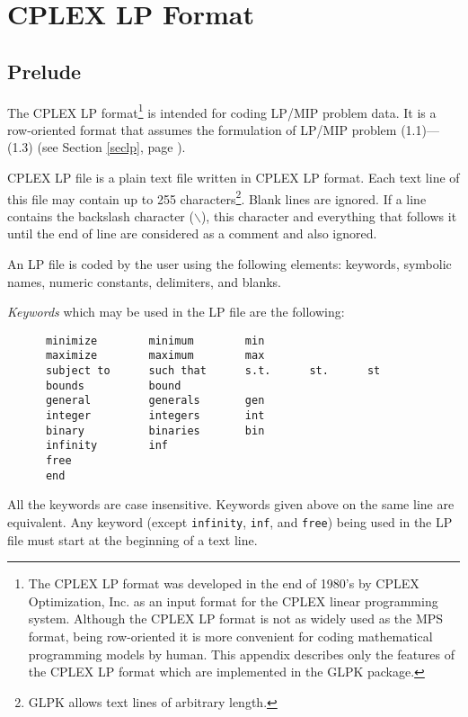 
\chapter{CPLEX LP Format}
\label{chacplex}

\section{Prelude}

The CPLEX LP format\footnote{The CPLEX LP format was developed in
the end of 1980's by CPLEX Optimization, Inc. as an input format for
the CPLEX linear programming system. Although the CPLEX LP format is
not as widely used as the MPS format, being row-oriented it is more
convenient for coding mathematical programming models by human. This
appendix describes only the features of the CPLEX LP format which are
implemented in the GLPK package.} is intended for coding LP/MIP problem
data. It is a row-oriented format that assumes the formulation of
LP/MIP problem (1.1)---(1.3) (see Section \ref{seclp}, page
\pageref{seclp}).

CPLEX LP file is a plain text file written in CPLEX LP format. Each
text line of this file may contain up to 255 characters\footnote{GLPK
allows text lines of arbitrary length.}. Blank lines are ignored.
If a line contains the backslash character ($\backslash$), this
character and everything that follows it until the end of line are
considered as a comment and also ignored.

An LP file is coded by the user using the following elements: keywords,
symbolic names, numeric constants, delimiters, and blanks.

{\it Keywords} which may be used in the LP file are the following:

\begin{verbatim}
      minimize        minimum        min
      maximize        maximum        max
      subject to      such that      s.t.      st.      st
      bounds          bound
      general         generals       gen
      integer         integers       int
      binary          binaries       bin
      infinity        inf
      free
      end
\end{verbatim}

\noindent
All the keywords are case insensitive. Keywords given above on the same
line are equivalent. Any keyword (except \verb|infinity|, \verb|inf|,
and \verb|free|) being used in the LP file must start at the beginning
of a text line.

